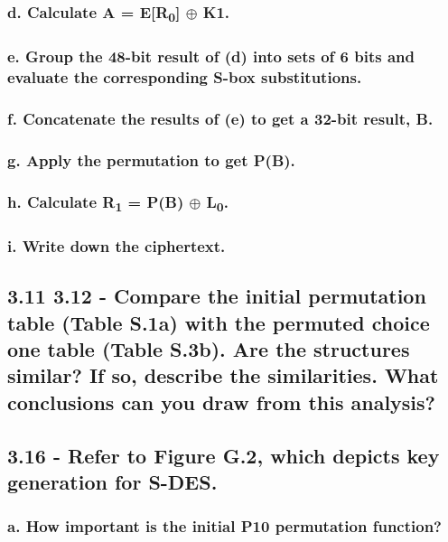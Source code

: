 \documentclass[
    article,            %
    11pt,               %
    oneside,            %
    a4paper,            %
    english,            %
    brazil,             %
    sumario=tradicional,
    ]{abntex2}
\begin{document}
\subsubsection*{d. Calculate A = E[R\textsubscript{0}] $\oplus$ K1.}
\subsubsection*{e. Group the 48-bit result of (d) into sets of 6 bits and evaluate the corresponding S-box substitutions.}
\subsubsection*{f. Concatenate the results of (e) to get a 32-bit result, B.}
\subsubsection*{g. Apply the permutation to get P(B).}
\subsubsection*{h. Calculate R\textsubscript{1} = P(B) $\oplus$ L\textsubscript{0}.}
\subsubsection*{i. Write down the ciphertext.}


\subsection*{\textbf{3.11 3.12 - Compare the initial permutation table (Table S.1a) with the permuted choice one table (Table S.3b). Are the structures similar? If so, describe the similarities. What conclusions can you draw from this analysis?}}


\subsection*{\textbf{3.16 - Refer to Figure G.2, which depicts key generation for S-DES.}}
\subsubsection*{a. How important is the initial P10 permutation function?}
\end{document}
